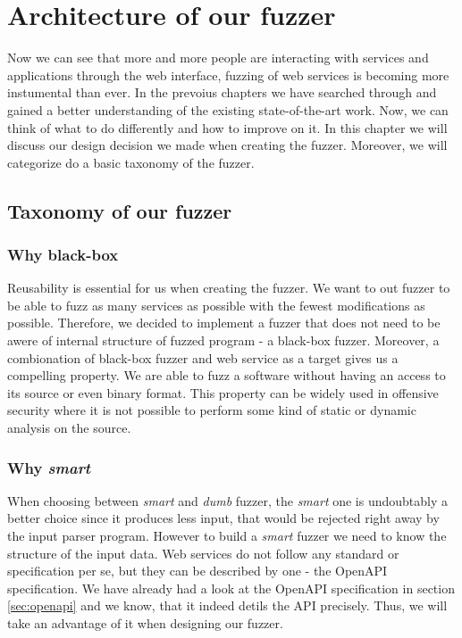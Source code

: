 \chapter{Architecture of our fuzzer}
Now we can see that more and more people are interacting with services and applications through the web interface, fuzzing of web services is becoming more instumental than ever. In the prevoius chapters we have searched through and gained a better understanding of the existing state-of-the-art work. Now, we can think of what to do differently and how to improve on it. In this chapter we will discuss our design decision we made when creating the fuzzer. Moreover, we will categorize do a basic taxonomy of the fuzzer.

\section{Taxonomy of our fuzzer}

\subsection{Why black-box}
Reusability is essential for us when creating the fuzzer. We want to out fuzzer to be able to fuzz as many services as possible with the fewest modifications as possible. Therefore, we decided to implement a fuzzer that does not need to be awere of internal structure of fuzzed program - a black-box fuzzer. Moreover, a combionation of black-box fuzzer and web service as a target gives us a compelling property. We are able to fuzz a software without having an access to its source or even binary format. This property can be widely used in offensive security where it is not possible to perform some kind of static or dynamic analysis on the source.

\subsection{Why \textit{smart}}
When choosing between \textit{smart} and \textit{dumb} fuzzer, the \textit{smart} one is undoubtably a better choice since it produces less input, that would be rejected right away by the input parser program. However to build a \textit{smart} fuzzer we need to know the structure of the input data. Web services do not follow any standard or specification per se, but they can be described by one - the OpenAPI specification. We have already had a look at the OpenAPI specification in section \ref{sec:openapi} and we know, that it indeed detils the API precisely. Thus, we will take an advantage of it when designing our fuzzer.


